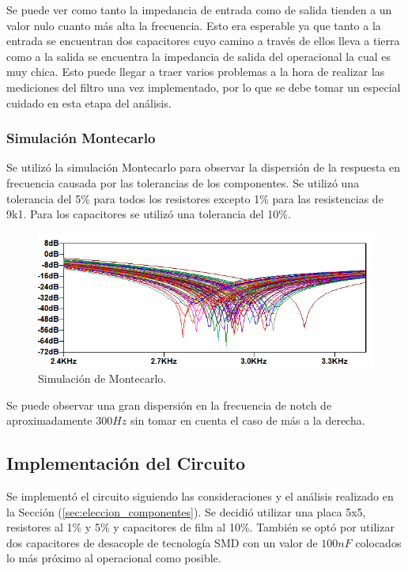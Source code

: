 Se puede ver como tanto la impedancia de entrada como de salida tienden a un valor nulo cuanto más alta la frecuencia. Esto era esperable ya que tanto a la entrada se encuentran dos capacitores cuyo camino a través de ellos lleva a tierra como a la salida se encuentra la impedancia de salida del operacional la cual es muy chica. Esto puede llegar a traer varios problemas a la hora de realizar las mediciones del filtro una vez implementado, por lo que se debe tomar un especial cuidado en esta etapa del análisis. 

\subsubsection{Simulación Montecarlo}
Se utilizó la simulación Montecarlo para observar la dispersión de la respuesta en frecuencia causada por las tolerancias de los componentes. Se utilizó una tolerancia del 5\% para todos los resistores excepto 1\% para las resistencias de 9k1. Para los capacitores se utilizó una tolerancia del 10\%.

\begin{figure}[H]
	\centering
	\includegraphics[width=\textwidth]{Imagenes/Montecarlo1.PNG}
	\caption{Simulación de Montecarlo.}
	\label{fig:montecarlo}
\end{figure}

Se puede observar una gran dispersión en la frecuencia de notch de aproximadamente $300Hz$ sin tomar en cuenta el caso de más a la derecha.

\subsection{Implementación del Circuito}
Se implementó el circuito siguiendo las consideraciones y el análisis realizado en la Sección (\ref{sec:eleccion_componentes}). Se decidió utilizar una placa 5x5, resistores al 1\% y 5\% y capacitores de film al 10\%. También se optó por utilizar dos capacitores de desacople de tecnología SMD con un valor de $100nF$ colocados lo más próximo al operacional como posible. 
